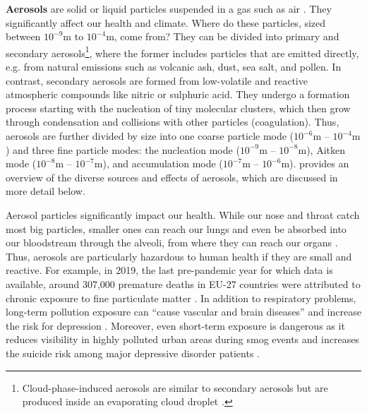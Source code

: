 \newpar \textbf{Aerosols} are solid or liquid particles suspended in a gas such as air \cite[p.~144]{atmospheric-chemistry-1999}. They significantly affect our health and climate. Where do these particles, sized between $10^{-9}\text{m}$ to $10^{-4}\text{m}$, come from? They can be divided into primary and secondary aerosols\footnote{Cloud-phase-induced aerosols are similar to secondary aerosols but are produced inside an evaporating cloud droplet \cite{cloud-aerosol-1996}.}, where the former includes particles that are emitted directly, e.g. from natural emissions such as volcanic ash, dust, sea salt, and pollen. In contrast, secondary aerosols are formed from low-volatile and reactive atmospheric compounds like nitric or sulphuric acid. They undergo a formation process starting with the nucleation of tiny molecular clusters, which then grow through condensation and collisions with other particles (coagulation). Thus, aerosols are further divided by size into one coarse particle mode ($10^{-6}\text{m}$ -- $10^{-4}\text{m}$) and three fine particle modes: the nucleation mode ($10^{-9}\text{m}$ -- $10^{-8}\text{m}$), Aitken mode ($10^{-8}\text{m}$ -- $10^{-7}\text{m}$), and accumulation mode ($10^{-7}\text{m}$ -- $10^{-6}\text{m}$).  provides an overview of the diverse sources and effects of aerosols, which are discussed in more detail below.

Aerosol particles significantly impact our health. While our nose and throat catch most big particles, smaller ones can reach our lungs and even be absorbed into our bloodstream through the alveoli, from where they can reach our organs \cite{aerosol-airways-2005}. Thus, aerosols are particularly hazardous to human health if they are small and reactive. For example, in 2019, the last pre-pandemic year for which data is available, around 307,000 premature deaths in EU-27 countries were attributed to chronic exposure to fine particulate matter \cite{eu-health-2021}. In addition to respiratory problems, long-term pollution exposure can ``cause vascular and brain diseases'' \cite{aerosol-health-2020} and increase the risk for depression \cite{pm-depression-risk-2022}. Moreover, even short-term exposure is dangerous as it reduces visibility in highly polluted urban areas during smog events and increases the suicide risk among major depressive disorder patients \cite{pm-suicide-risk-2022}.

